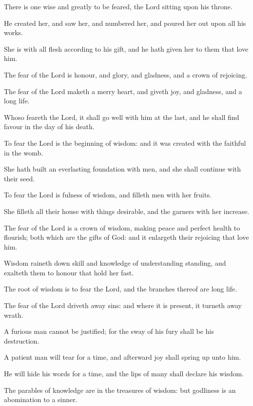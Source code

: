 {\par }{\PP {}There is one wise and greatly to be feared, the Lord sitting upon his throne.
\par }{\PP {}He created her, and saw her, and numbered her, and poured her out upon all his works.
\par }{\PP {}She is with all flesh according to his gift, and he hath given her to them that love him.
\par }{\PP {}The fear of the Lord is honour, and glory, and gladness, and a crown of rejoicing.
\par }{\PP {}The fear of the Lord maketh a merry heart, and giveth joy, and gladness, and a long life.
\par }{\PP {}Whoso feareth the Lord, it shall go well with him at the last, and he shall find favour in the day of his death.
\par }{\PP {}To fear the Lord is the beginning of wisdom: and it was created with the faithful in the womb.
\par }{\PP {}She hath built an everlasting foundation with men, and she shall continue with their seed.
\par }{\PP {}To fear the Lord is fulness of wisdom, and filleth men with her fruits.
\par }{\PP {}She filleth all their house with things desirable, and the garners with her increase.
\par }{\PP {}The fear of the Lord is a crown of wisdom, making peace and perfect health to flourish; both which are the gifts of God: and it enlargeth their rejoicing that love him.
\par }{\PP {}Wisdom raineth down skill and knowledge of understanding standing, and exalteth them to honour that hold her fast.
\par }{\PP {}The root of wisdom is to fear the Lord, and the branches thereof are long life.
\par }{\PP {}The fear of the Lord driveth away sins: and where it is present, it turneth away wrath.
\par }{\PP {}A furious man cannot be justified; for the sway of his fury shall be his destruction.
\par }{\PP {}A patient man will tear for a time, and afterward joy shall spring up unto him.
\par }{\PP {}He will hide his words for a time, and the lips of many shall declare his wisdom.
\par }{\PP {}The parables of knowledge are in the treasures of wisdom: but godliness is an abomination to a sinner.
}
